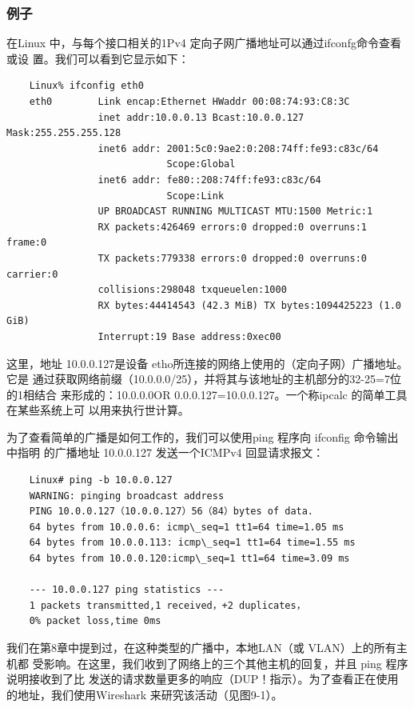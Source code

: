 \subsubsection{例子}
在Linux 中，与每个接口相关的1Pv4 定向子网广播地址可以通过ifconfg命令查看或设
置。我们可以看到它显示如下：
\begin{verbatim}
    Linux% ifconfig eth0
    eth0        Link encap:Ethernet HWaddr 00:08:74:93:C8:3C
                inet addr:10.0.0.13 Bcast:10.0.0.127 Mask:255.255.255.128
                inet6 addr: 2001:5c0:9ae2:0:208:74ff:fe93:c83c/64
                            Scope:Global
                inet6 addr: fe80::208:74ff:fe93:c83c/64
                            Scope:Link
                UP BROADCAST RUNNING MULTICAST MTU:1500 Metric:1
                RX packets:426469 errors:0 dropped:0 overruns:1 frame:0
                TX packets:779338 errors:0 dropped:0 overruns:0 carrier:0
                collisions:298048 txqueuelen:1000
                RX bytes:44414543 (42.3 MiB) TX bytes:1094425223 (1.0 GiB)
                Interrupt:19 Base address:0xec00
\end{verbatim}

这里，地址 10.0.0.127是设备 etho所连接的网络上使用的（定向子网）广播地址。它是
通过获取网络前缀（10.0.0.0/25），并将其与该地址的主机部分的32-25=7位的1相结合
来形成的：10.0.0.0OR 0.0.0.127=10.0.0.127。一个称ipcalc 的简单工具在某些系统上可
以用来执行世计算。

为了查看简单的广播是如何工作的，我们可以使用ping 程序向 ifconfig 命令输出中指明
的广播地址 10.0.0.127 发送一个ICMPv4 回显请求报文：

\begin{verbatim}
    Linux# ping -b 10.0.0.127
    WARNING: pinging broadcast address
    PING 10.0.0.127（10.0.0.127）56（84）bytes of data.
    64 bytes from 10.0.0.6: icmp\_seq=1 tt1=64 time=1.05 ms
    64 bytes from 10.0.0.113: icmp\_seq=1 tt1=64 time=1.55 ms
    64 bytes from 10.0.0.120:icmp\_seq=1 tt1=64 time=3.09 ms

    --- 10.0.0.127 ping statistics ---
    1 packets transmitted,1 received，+2 duplicates，
    0% packet loss,time 0ms
\end{verbatim}

我们在第8章中提到过，在这种类型的广播中，本地LAN（或 VLAN）上的所有主机都
受影响。在这里，我们收到了网络上的三个其他主机的回复，并且 ping 程序说明接收到了比
发送的请求数量更多的响应（DUP！指示）。为了查看正在使用的地址，我们使用Wireshark
来研究该活动（见图9-1）。


